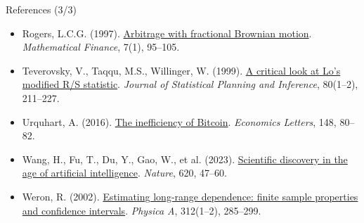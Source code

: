 \begin{frame}{References (3/3)}
\begin{itemize}
    \item Rogers, L.C.G. (1997). \href{https://doi.org/10.1111/1467-9965.00025}{Arbitrage with fractional Brownian motion}. \textit{Mathematical Finance}, 7(1), 95--105.
    \item Teverovsky, V., Taqqu, M.S., Willinger, W. (1999). \href{https://doi.org/10.1016/S0378-3758(98)00250-X}{A critical look at Lo's modified R/S statistic}. \textit{Journal of Statistical Planning and Inference}, 80(1--2), 211--227.
    \item Urquhart, A. (2016). \href{https://doi.org/10.1016/j.econlet.2016.09.019}{The inefficiency of Bitcoin}. \textit{Economics Letters}, 148, 80--82.
    \item Wang, H., Fu, T., Du, Y., Gao, W., et al. (2023). \href{https://doi.org/10.1038/s41586-023-06221-2}{Scientific discovery in the age of artificial intelligence}. \textit{Nature}, 620, 47--60.
    \item Weron, R. (2002). \href{https://doi.org/10.1016/S0378-4371(02)00961-5}{Estimating long-range dependence: finite sample properties and confidence intervals}. \textit{Physica A}, 312(1--2), 285--299.
\end{itemize}
\end{frame}


